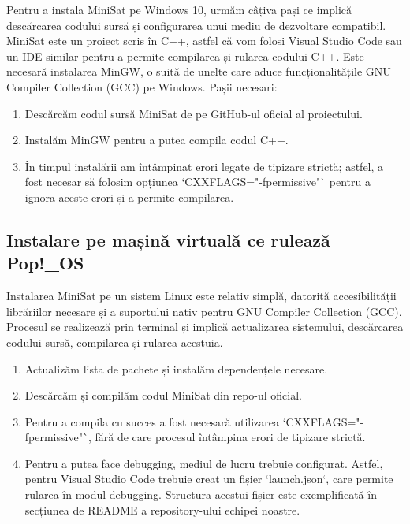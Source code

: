 \documentclass{llncs}
\begin{document}
Pentru a instala MiniSat pe Windows 10, urmăm câțiva pași ce implică descărcarea codului sursă și configurarea unui mediu de dezvoltare compatibil. MiniSat este un proiect scris în C++, astfel că vom folosi Visual Studio Code sau un IDE similar pentru a permite compilarea și rularea codului C++. Este necesară instalarea MinGW, o suită de unelte care aduce funcționalitățile GNU Compiler Collection (GCC) pe Windows. Pașii necesari:
\begin{enumerate}
    \item Descărcăm codul sursă MiniSat de pe GitHub-ul oficial al proiectului\cite{ref_MiniSat_Original_Repository}.
    \item Instalăm MinGW pentru a putea compila codul C++.
    \item În timpul instalării am întâmpinat erori legate de tipizare strictă; astfel, a fost necesar să folosim opțiunea `CXXFLAGS="-fpermissive"` pentru a ignora aceste erori și a permite compilarea.
\end{enumerate}

\subsection{Instalare pe mașină virtuală ce rulează Pop!\_OS}

Instalarea MiniSat pe un sistem Linux este relativ simplă, datorită accesibilității librăriilor necesare și a suportului nativ pentru GNU Compiler Collection (GCC). Procesul se realizează prin terminal și implică actualizarea sistemului, descărcarea codului sursă, compilarea și rularea acestuia.

\begin{enumerate}
    \item Actualizăm lista de pachete și instalăm dependențele necesare.
    \item Descărcăm și compilăm codul MiniSat din repo-ul oficial.
    \item Pentru a compila cu succes a fost necesară utilizarea `CXXFLAGS="-fpermissive"`, fără de care procesul întâmpina erori de tipizare strictă.
    \item Pentru a putea face debugging, mediul de lucru trebuie configurat. Astfel, pentru Visual Studio Code trebuie creat un fișier `launch.json`, care permite rularea în modul debugging. Structura acestui fișier este exemplificată în secțiunea de README a repository-ului echipei noastre\cite{ref_MiniSat_our_fork}.
\end{enumerate}
\end{document}
